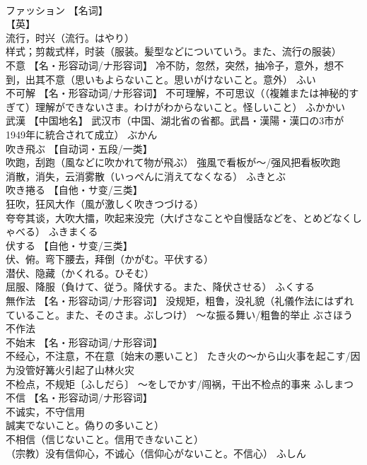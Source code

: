 \documentclass[8pt]{extreport}
\begin{document}
\begin{CJK}{UTF8}{min}
\\	ファッション	【名词】 
\\	【英】
\\	流行，时兴（流行。はやり） 
\\	样式；剪裁式样，时装（服装。髪型などについていう。また、流行の服装）		
\\	不意	【名・形容动词/ナ形容词】 冷不防，忽然，突然，抽冷子，意外，想不到，出其不意（思いもよらないこと。思いがけないこと。意外）	ふい	
\\	不可解	【名・形容动词/ナ形容词】 不可理解，不可思议（（複雑または神秘的すぎて）理解ができないさま。わけがわからないこと。怪しいこと）	ふかかい	
\\	武漢	【中国地名】 武汉市（中国、湖北省の省都。武昌・漢陽・漢口の3市が1949年に統合されて成立）	ぶかん	
\\	吹き飛ぶ	【自动词・五段/一类】 
\\	吹跑，刮跑（風などに吹かれて物が飛ぶ） 強風で看板が～/强风把看板吹跑 
\\	消散，消失，云消雾散（いっぺんに消えてなくなる）	ふきとぶ	
\\	吹き捲る	【自他・サ变/三类】 
\\	狂吹，狂风大作（風が激しく吹きつづける） 
\\	夸夸其谈，大吹大擂，吹起来没完（大げさなことや自慢話などを、とめどなくしゃべる）	ふきまくる	
\\	伏する	【自他・サ变/三类】 
\\	伏、俯。弯下腰去，拜倒（かがむ。平伏する） 
\\	潜伏、隐藏（かくれる。ひそむ） 
\\	屈服、降服（負けて、従う。降伏する。また、降伏させる）	ふくする	
\\	無作法	【名・形容动词/ナ形容词】 没规矩，粗鲁，没礼貌（礼儀作法にはずれていること。また、そのさま。ぶしつけ） ～な振る舞い/粗鲁的举止	ぶさほう	不作法
\\	不始末	【名・形容动词/ナ形容词】 
\\	不经心，不注意，不在意〔始末の悪いこと〕 たき火の～から山火事を起こす/因为没管好篝火引起了山林火灾 
\\	不检点，不规矩〔ふしだら〕 ～をしでかす/闯祸，干出不检点的事来	ふしまつ	
\\	不信	【名・形容动词/ナ形容词】 
\\	不诚实，不守信用
\\	誠実でないこと。偽りの多いこと） 
\\	不相信（信じないこと。信用できないこと） 
\\	（宗教）没有信仰心，不诚心（信仰心がないこと。不信心）	ふしん	

\end{CJK}
\end{document}
